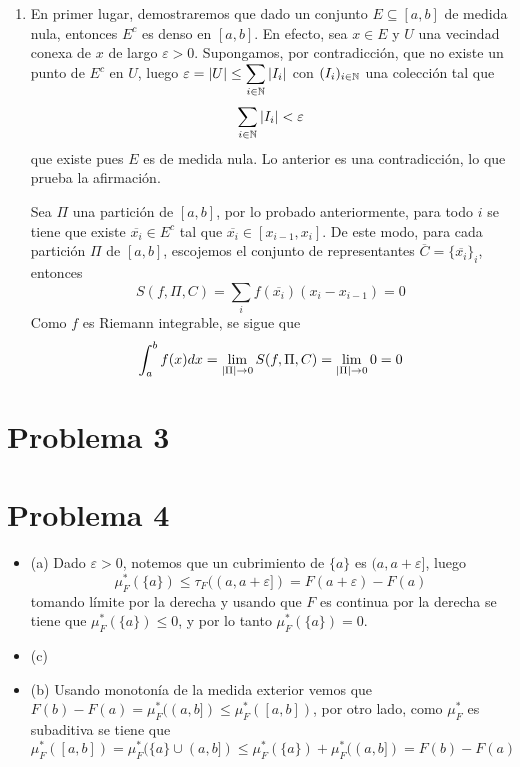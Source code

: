 \documentclass{article}
\begin{document}
\begin{enumerate}
    \item En primer lugar, demostraremos que dado un conjunto $E\subseteq[a,b]$ de medida nula, 
    entonces $E^{c}$ es denso en $[a,b]$. En efecto, sea $x\in E$ y $U$ una vecindad conexa de $x$ 
    de largo $\varepsilon>0$. Supongamos, por contradicción, que no existe un punto de $E^{c}$ en 
    $U$, luego $\varepsilon=\left|U \right|\leq\displaystyle\sum_{i\in\mathbb{N}}\left|I_{i} \right|$ con $(I_{i})_{i\in\mathbb{N}}$ una colección
    tal que
    \begin{equation*}
        \sum_{i\in\mathbb{N}}\left|I_{i} \right|<\varepsilon
    \end{equation*}
    que existe pues $E$ es de medida nula. Lo anterior es una contradicción, lo que prueba la
    afirmación.
    \vspace{4mm}

    \noindent Sea $\Pi$ una partición de $[a,b]$, por lo probado anteriormente, para todo $i$ se
    tiene que existe $\overline{x_{i}}\in E^{c}$ tal que $\overline{x_{i}}\in[x_{i-1},x_{i}]$. De
    este modo, para cada partición $\Pi$ de $[a,b]$, escojemos el conjunto de representantes 
    $\overline{C}=\{\overline{x_{i}}\}_{i}$, entonces
    \begin{equation*}
        S(f,\Pi,C)=\sum_{i}f(\overline{x_{i}})(x_{i}-x_{i-1})=0
    \end{equation*}
    Como $f$ es Riemann integrable, se sigue que
    \begin{equation*}
        \int_{a}^{b}f(x)dx=\lim_{\left|\Pi \right|\to0}S(f,\Pi,C)=\lim_{\left|\Pi \right|\to0}0=0
    \end{equation*}
\end{enumerate}

\section*{Problema 3}

\section*{Problema 4}
\begin{itemize}
    \item (a) Dado $\varepsilon>0$, notemos que un cubrimiento de $\{a\}$ es $(a,a+\varepsilon]$,
    luego
    \begin{equation*}
        \mu^{*}_{F}(\{a\})\leq\tau_{F}((a,a+\varepsilon])=F(a+\varepsilon)-F(a)
    \end{equation*}
    tomando límite por la derecha y usando que $F$ es continua por la derecha se tiene que 
    $\mu^{*}_{F}(\{a\})\leq0$, y por lo tanto $\mu^{*}_{F}(\{a\})=0$.

    \item (c)

    \item (b) Usando monotonía de la medida exterior vemos que 
    $F(b)-F(a)=\mu^{*}_{F}((a,b])\leq\mu^{*}_{F}([a,b])$, por otro lado, como $\mu^{*}_{F}$ es
    subaditiva se tiene que
    \begin{equation*}
        \mu^{*}_{F}([a,b])=\mu^{*}_{F}(\{a\}\cup(a,b])\leq\mu^{*}_{F}(\{a\})+\mu^{*}_{F}((a,b])
        =F(b)-F(a)
    \end{equation*}
\end{itemize}

\end{document}
